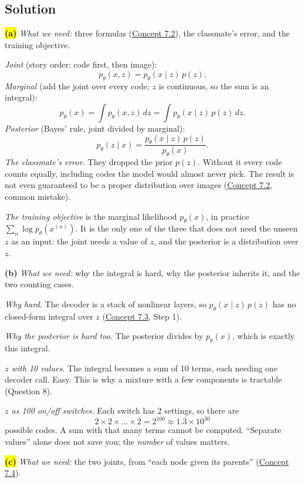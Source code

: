 \documentclass[12pt,a4paper]{article}
\begin{document}
\subsection{Solution}

\colorbox{yellow}{\textbf{(a)}} \emph{What we need:} three formulas (\hyperref[c7-2]{Concept 7.2}), the classmate's error, and the training objective.

\emph{Joint} (story order: code first, then image):
\[
p_\theta(x,z)=p_\theta(x\mid z)\,p(z).
\]
\emph{Marginal} (add the joint over every code; $z$ is continuous, so the sum is an integral):
\[
p_\theta(x)=\int p_\theta(x,z)\,dz=\int p_\theta(x\mid z)\,p(z)\,dz .
\]
\emph{Posterior} (Bayes' rule, joint divided by marginal):
\[
p_\theta(z\mid x)=\frac{p_\theta(x\mid z)\,p(z)}{p_\theta(x)} .
\]
\emph{The classmate's error.} They dropped the prior $p(z)$. Without it every code counts equally, including codes the model would almost never pick. The result is not even guaranteed to be a proper distribution over images (\hyperref[c7-2]{Concept 7.2}, common mistake).

\emph{The training objective} is the marginal likelihood $p_\theta(x)$, in practice $\sum_n\log p_\theta(x^{(n)})$. It is the only one of the three that does not need the unseen $z$ as an input: the joint needs a value of $z$, and the posterior is a distribution over $z$.

\textbf{(b)} \emph{What we need:} why the integral is hard, why the posterior inherits it, and the two counting cases.

\emph{Why hard.} The decoder is a stack of nonlinear layers, so $p_\theta(x\mid z)\,p(z)$ has no closed-form integral over $z$ (\hyperref[c7-3]{Concept 7.3}, Step 1).

\emph{Why the posterior is hard too.} The posterior divides by $p_\theta(x)$, which is exactly this integral.

\emph{$z$ with 10 values.} The integral becomes a sum of 10 terms, each needing one decoder call. Easy. This is why a mixture with a few components is tractable (Question 8).

\emph{$z$ as 100 on/off switches.} Each switch has 2 settings, so there are
\[
2\times2\times\dots\times2=2^{100}\approx1.3\times10^{30}
\]
possible codes. A sum with that many terms cannot be computed. ``Separate values'' alone does not save you; the \emph{number} of values matters.

\colorbox{yellow}{\textbf{(c)}} \emph{What we need:} the two joints, from ``each node given its parents'' (\hyperref[c7-4]{Concept 7.4}).
\end{document}
